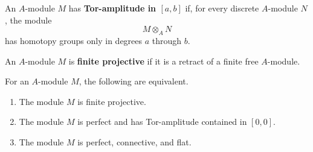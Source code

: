 \begin{definition}
\label{def:tor-amplitude}
An $A$-module $M$ has \textbf{Tor-amplitude in $[a,b]$} if, for every
discrete $A$-module $N$, the module
\[
    M\otimes_A N
\]
has homotopy groups only in degrees $a$ through $b$.
\end{definition}

\begin{definition}
\label{def:finite-projective-module-spectrum}
An $A$-module $M$ is \textbf{finite projective} if it is a retract of a
finite free $A$-module.
\end{definition}

\begin{proposition}
\label{prop:finite-projective-characterization}
For an $A$-module $M$, the following are equivalent.
\begin{enumerate}[label=(\roman*)]
    \item The module $M$ is finite projective.

    \item The module $M$ is perfect and has Tor-amplitude contained in
    $[0,0]$.

    \item The module $M$ is perfect, connective, and flat.
\end{enumerate}
\end{proposition}
